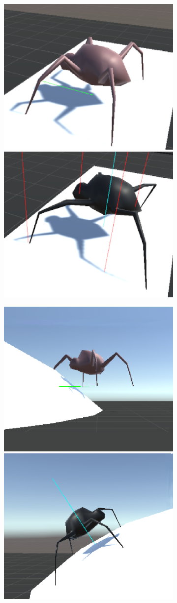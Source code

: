 \begin{figure}[!h]
    \centering
    \captionsetup{justification=centering}
    \begin{subfigure}{\textwidth}
        \centering
        \includegraphics[width=0.4\linewidth]{grafika/sp_b_flat.eps}
        \hspace{0.1cm}
        \includegraphics[width=0.4\linewidth]{grafika/sp_ik_flat.eps}
        \subcaption{}
        \label{fig:sp_flat}
    \end{subfigure}
    \begin{subfigure}{\textwidth}
        \centering
        \includegraphics[width=0.4\linewidth]{grafika/sp_b_round.eps}
        \hspace{0.1cm}
        \includegraphics[width=0.4\linewidth]{grafika/sp_ik_round.eps}

\end{subfigure}
\end{figure}
